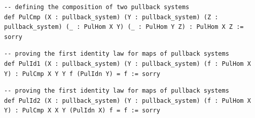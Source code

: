 \documentclass{book}
\theoremstyle{definition}
\newcounter{lcounter}
\begin{document}
\begin{center} \begin{tcolorbox}[width=5in,colback={white},title={\begin{center}\texttt{Lean \thelcounter} \addtocounter{lcounter}{1} \end{center}},colbacktitle=Blue,coltitle=black] \begin{verbatim}
-- defining the composition of two pullback systems
def PulCmp (X : pullback_system) (Y : pullback_system) (Z : pullback_system) (_ : PulHom X Y) (_ : PulHom Y Z) : PulHom X Z := sorry
\end{verbatim} \end{tcolorbox} \end{center}
\begin{center} \begin{tcolorbox}[width=5in,colback={white},title={\begin{center}\texttt{Lean \thelcounter} \addtocounter{lcounter}{1} \end{center}},colbacktitle=Blue,coltitle=black] \begin{verbatim}
-- proving the first identity law for maps of pullback systems
def PulId1 (X : pullback_system) (Y : pullback_system) (f : PulHom X Y) : PulCmp X Y Y f (PulIdn Y) = f := sorry
\end{verbatim} \end{tcolorbox} \end{center}
\begin{center} \begin{tcolorbox}[width=5in,colback={white},title={\begin{center}\texttt{Lean \thelcounter} \addtocounter{lcounter}{1} \end{center}},colbacktitle=Blue,coltitle=black] \begin{verbatim}
-- proving the first identity law for maps of pullback systems
def PulId2 (X : pullback_system) (Y : pullback_system) (f : PulHom X Y) : PulCmp X X Y (PulIdn X) f = f := sorry
\end{verbatim}

 \end{tcolorbox} \end{center}
\end{document}

